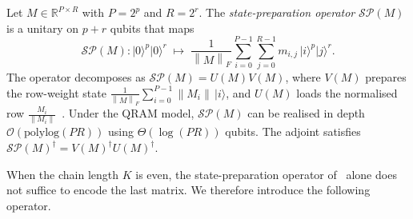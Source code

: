 \documentclass[a4paper,UKenglish,cleveref,autoref,thm-restate]{socg-lipics-v2021}
\providecommand{\ket}[1]{\lvert #1 \rangle}
\newcommand{\norm}[1]{\left\| #1 \right\|}
\newcommand{\SP}{\mathcal{SP}}        %
\begin{document}
\begin{definition}\label{def:sp}
  Let $M \in \mathbb{R}^{P \times R}$ with $P = 2^p$ and $R = 2^r$.
  The \emph{state-preparation operator} $\SP(M)$ is a unitary on
  $p + r$ qubits that maps
  \begin{equation}\label{eq:sp}
    \SP(M)\colon \ket{0}^{p}\ket{0}^{r}
    \;\longmapsto\;
    \frac{1}{\norm{M}_F}
    \sum_{i=0}^{P-1}\sum_{j=0}^{R-1} m_{i,j}\,\ket{i}^{p}\ket{j}^{r}.
  \end{equation}
  The operator decomposes as $\SP(M) = U(M) V(M)$, where
  $V(M)$ prepares the row-weight state
  $\frac{1}{\norm{M}_F}\sum_{i=0}^{P-1} \norm{M_i}\,\ket{i}$, and $U(M)$ loads the normalised row
  $\frac{M_i}{\norm{M_i}}$~\cite{kerenidis_et_al:LIPIcs.ITCS.2017.49}.
  Under the QRAM model, $\SP(M)$ can be realised in depth $\mathcal{O}(\mathrm{polylog}(PR))$ using
  $\Theta(\log(PR))$ qubits.
  The adjoint satisfies
  $\SP(M)^\dagger = V(M)^\dagger  U(M)^\dagger$.
\end{definition}

When the chain length $K$ is even, the state-preparation operator of~ alone does not suffice to encode the last matrix. We therefore introduce the following operator.
\end{document}
